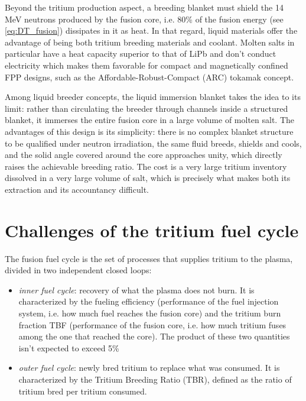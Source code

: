 \documentclass[a4paper,11pt,oneside]{report}
\begin{document}
Beyond the tritium production aspect, a breeding blanket must shield the 14 MeV neutrons produced by the fusion core, i.e. 80\% of the fusion energy (see \cref{eq:DT_fusion}) dissipates in it as heat. In that regard, liquid materials offer the advantage of being both tritium breeding materials and coolant. Molten salts in particular have a heat capacity superior to that of LiPb and don't conduct electricity which makes them favorable for compact and magnetically confined FPP designs, such as the Affordable-Robust-Compact (ARC) tokamak concept\cite{sorbom_arc_2015}. 

Among liquid breeder concepts, the liquid immersion blanket takes the idea to its limit: rather than circulating the breeder through channels inside a structured blanket, it immerses the entire fusion core in a large volume of molten salt. The advantages of this design is its simplicity: there is no complex blanket structure to be qualified under neutron irradiation, the same fluid breeds, shields and cools, and the solid angle covered around the core approaches unity, which directly raises the achievable breeding ratio\cite{ferrero_multiphysics_2025}. The cost is a very large tritium inventory dissolved in a very large volume of salt, which is precisely what makes both its extraction and its accountancy difficult\cite{ferry_libra_2023}.


\section{Challenges of the tritium fuel cycle}
The fusion fuel cycle is the set of processes that supplies tritium to the plasma, divided in two independent closed loops: %
\begin{itemize}
    \item \textit{inner fuel cycle}: recovery of what the plasma does not burn. It is characterized by the fueling efficiency (performance of the fuel injection system, i.e. how much fuel reaches the fusion core) and the tritium burn fraction TBF (performance of the fusion core, i.e. how much tritium fuses among the one that reached the core). The product of these two quantities isn't expected to exceed 5\% \cite{abdou_physics_2020}
    \item \textit{outer fuel cycle}: newly bred tritium to replace what was consumed. It is characterized by the Tritium Breeding Ratio (TBR), defined as the ratio of tritium bred per tritium consumed. 
\end{itemize}
\end{document}
